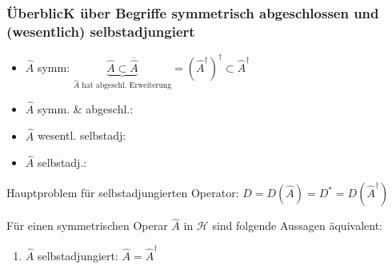 \subsubsection{ÜberblicK über Begriffe symmetrisch abgeschlossen und (wesentlich) selbstadjungiert}
\begin{itemize}
    \item $\hat{A}$ symm: $\underbrace{\hat{A} \subset \overline{\hat{A}}}_{\hat{A} \textrm{ hat 
            abgeschl. Erweiterung}} = \left(\hat{A}^\dagger\right)^\dagger \subset \hat{A}^\dagger$
    \item $\hat{A}$ symm. \& abgeschl.:
    \item $\hat{A}$ wesentl. selbstadj: 
    \item $\hat{A}$ selbstadj.: 
\end{itemize}

Hauptproblem für selbstadjungierten Operator: $D = D(\hat{A}) = D^\ast = D(\hat{A}^\dagger)$

\begin{Satz}
    Für einen symmetrischen Operar $\hat{A}$ in $\mathcal{H}$ sind folgende Aussagen äquivalent:

    \begin{enumerate}[label=(\alph*)]
        \item $\hat{A}$ selbstadjungiert: $\hat{A} = \hat{A}^\dagger$
        
    \end{enumerate}
    
\end{Satz}
